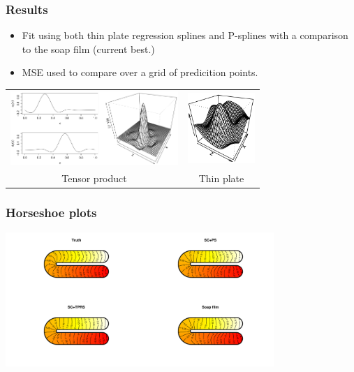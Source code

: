 \documentclass[ignorenonframetext]{beamer} %
\newcommand{\bc}{\begin{center}}
\newcommand{\ec}{\end{center}}
\newcommand{\bi}{\begin{itemize}}
\newcommand{\ei}{\end{itemize}}
\begin{document}
\begin{frame}
	\frametitle{Results}
       \bi
         \item Fit using both thin plate regression splines and P-splines with a comparison to the soap film (current best.) 
         \item MSE used to compare over a grid of predicition points.
        \ei
       \bc\begin{tabular}{@{}cc}
          \includegraphics[width=2.5in]{figs/tensorproduct} & \includegraphics[width=1in]{figs/tprs}\\
          Tensor product & Thin plate\\
       \end{tabular}\ec
\end{frame}


\begin{frame}
	\frametitle{Horseshoe plots}
            \centering
          \includegraphics[width=4in,trim=2in 1in 2in 0.5in]{figs/compsmooth}
\end{frame}
\end{document}
